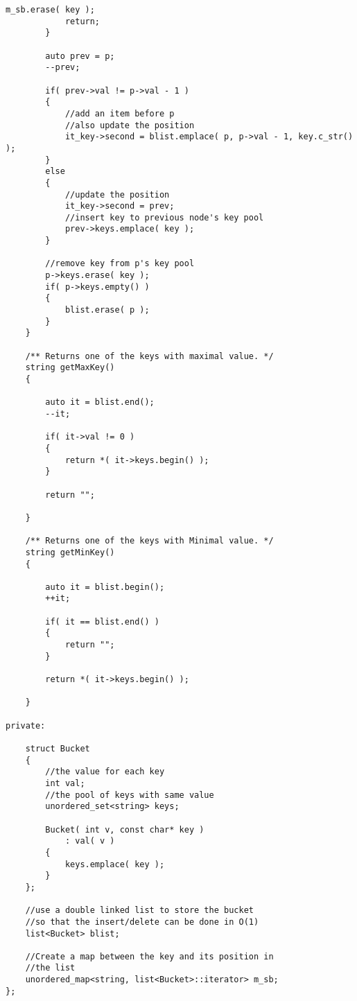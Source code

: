 \begin{lstlisting}[style=customc, caption={Double Linked List and Iterator For Value In Hash Map}]
            m_sb.erase( key );
            return;
        }

        auto prev = p;
        --prev;

        if( prev->val != p->val - 1 )
        {
            //add an item before p
            //also update the position
            it_key->second = blist.emplace( p, p->val - 1, key.c_str() );
        }
        else
        {
            //update the position
            it_key->second = prev;
            //insert key to previous node's key pool
            prev->keys.emplace( key );
        }

        //remove key from p's key pool
        p->keys.erase( key );
        if( p->keys.empty() )
        {
            blist.erase( p );
        }
    }

    /** Returns one of the keys with maximal value. */
    string getMaxKey()
    {

        auto it = blist.end();
        --it;

        if( it->val != 0 )
        {
            return *( it->keys.begin() );
        }

        return "";

    }

    /** Returns one of the keys with Minimal value. */
    string getMinKey()
    {

        auto it = blist.begin();
        ++it;

        if( it == blist.end() )
        {
            return "";
        }

        return *( it->keys.begin() );

    }

private:

    struct Bucket
    {
        //the value for each key
        int val;
        //the pool of keys with same value
        unordered_set<string> keys;

        Bucket( int v, const char* key )
            : val( v )
        {
            keys.emplace( key );
        }
    };

    //use a double linked list to store the bucket
    //so that the insert/delete can be done in O(1)
    list<Bucket> blist;

    //Create a map between the key and its position in
    //the list
    unordered_map<string, list<Bucket>::iterator> m_sb;
};
\end{lstlisting}